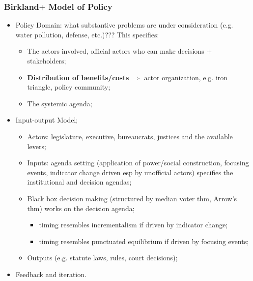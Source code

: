 \documentclass[aspectratio=169]{beamer}
\theoremstyle{principle}
\begin{document}
\begin{frame}
\frametitle{Birkland$+$ Model of Policy}
\begin{itemize}
\item Policy Domain: what substantive problems are under consideration (e.g. water pollution, defense, etc.)???  This specifies:
\begin{itemize}
\item The actors involved, official actors who can make decisions $+$ stakeholders; 
\item \textbf{Distribution of benefits/costs} $\Rightarrow$ actor organization, e.g. iron triangle, policy community;
\item The systemic agenda; 
\end{itemize} 
\bigskip
\item \color{black}Input-output Model;
\begin{itemize}
\item Actors: legislature, executive, bureaucrats, justices and the available levers;
\item Inputs: agenda setting (application of power/social construction, focusing events, indicator change driven esp by unofficial actors) specifies the institutional and decision agendas;
\item Black box decision making (structured by median voter thm, Arrow's thm) works on the decision agenda;
\begin{itemize}
\item timing resembles incrementalism if driven by indicator change;
\item timing resembles punctuated equilibrium if driven by focusing events;
 \end{itemize}
\item Outputs (e.g. statute laws, rules, court decisions);
\end{itemize}
\bigskip
\item Feedback and iteration.
\end{itemize}
\end{frame}
\end{document}
